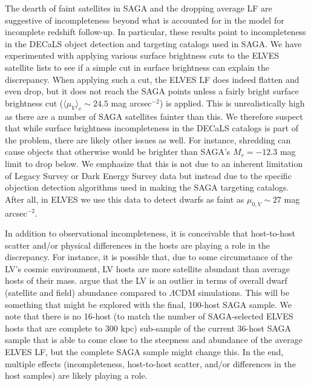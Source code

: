\documentclass[twocolumn]{aastex62}
\begin{document}
The dearth of faint satellites in SAGA and the dropping average LF are suggestive of incompleteness beyond what is accounted for in the model for incomplete redshift follow-up. In particular, these results point to incompleteness in the DECaLS \citep{lang2016, decals} object detection and targeting catalogs used in SAGA. We have experimented with applying various surface brightness cuts to the ELVES satellite lists to see if a simple cut in surface brightness can explain the discrepancy. When applying such a cut, the ELVES LF does indeed flatten and even drop, but it does not reach the SAGA points unless a fairly bright surface brightness cut ($\langle \mu_V \rangle_e \sim24.5$ mag arcsec$^{-2}$) is applied. This is unrealistically high as there are a number of SAGA satellites fainter than this. We therefore suspect that while surface brightness incompleteness in the DECaLS catalogs is part of the problem, there are likely other issues as well. For instance, shredding can cause objects that otherwise would be brighter than SAGA's $M_r=-12.3$ mag limit to drop below. We emphasize that this is not due to an inherent limitation of Legacy Survey or Dark Energy Survey data but instead due to the specific objection detection algorithms used in making the SAGA targeting catalogs. After all, in ELVES we use this data to detect dwarfs as faint as $\mu_{0,V} \sim 27$ mag arcsec$^{-2}$. 


In addition to observational incompleteness, it is conceivable that host-to-host scatter and/or physical differences in the hosts are playing a role in the discrepancy. For instance, it is possible that, due to some circumstance of the LV's cosmic environment, LV hosts are more satellite abundant than average hosts of their mass. \citet{neuzil2020} argue that the LV is an outlier in terms of overall dwarf (satellite and field) abundance compared to $\Lambda$CDM simulations. This will be something that might be explored with the final, 100-host SAGA sample. We note that there is no 16-host (to match the number of SAGA-selected ELVES hosts that are complete to 300 kpc) sub-sample of the current 36-host SAGA sample that is able to come close to the steepness and abundance of the average ELVES LF, but the complete SAGA sample might change this. In the end, multiple effects (incompleteness, host-to-host scatter, and/or differences in the host samples) are likely playing a role. 
\end{document}
